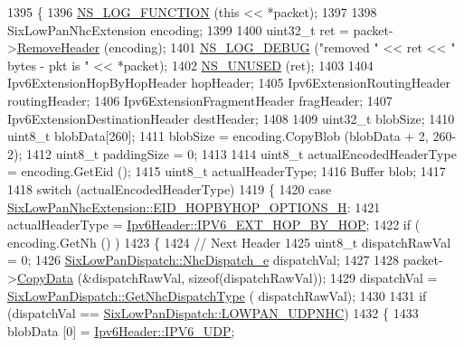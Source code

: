 \begin{DoxyCode}
1395 \{
1396   \hyperlink{log-macros-disabled_8h_a90b90d5bad1f39cb1b64923ea94c0761}{NS\_LOG\_FUNCTION} (\textcolor{keyword}{this} << *packet);
1397 
1398   SixLowPanNhcExtension encoding;
1399 
1400   uint32\_t ret = packet->\hyperlink{classns3_1_1Packet_a0961eccf975d75f902d40956c93ba63e}{RemoveHeader} (encoding);
1401   \hyperlink{group__logging_ga413f1886406d49f59a6a0a89b77b4d0a}{NS\_LOG\_DEBUG} (\textcolor{stringliteral}{"removed "} << ret << \textcolor{stringliteral}{" bytes - pkt is "} << *packet);
1402   \hyperlink{unused_8h_a3ba03ad859378e9f01285afb60f0e3ab}{NS\_UNUSED} (ret);
1403 
1404   Ipv6ExtensionHopByHopHeader hopHeader;
1405   Ipv6ExtensionRoutingHeader routingHeader;
1406   Ipv6ExtensionFragmentHeader fragHeader;
1407   Ipv6ExtensionDestinationHeader destHeader;
1408 
1409   uint32\_t blobSize;
1410   uint8\_t blobData[260];
1411   blobSize = encoding.CopyBlob (blobData + 2, 260-2);
1412   uint8\_t paddingSize = 0;
1413 
1414   uint8\_t actualEncodedHeaderType = encoding.GetEid ();
1415   uint8\_t actualHeaderType;
1416   Buffer blob;
1417 
1418   \textcolor{keywordflow}{switch} (actualEncodedHeaderType)
1419     \{
1420     \textcolor{keywordflow}{case} \hyperlink{classns3_1_1SixLowPanNhcExtension_ac692a22abe80c30bcbafa57ef36bf5ada21fdd5323221baf11ca4aa76cfd75690}{SixLowPanNhcExtension::EID\_HOPBYHOP\_OPTIONS\_H}:
1421       actualHeaderType = \hyperlink{classns3_1_1Ipv6Header_a226429221a066c5e3b1f260caf27d1e9aa0413202f88bebb4f91a138e317b6bbd}{Ipv6Header::IPV6\_EXT\_HOP\_BY\_HOP};
1422       \textcolor{keywordflow}{if} ( encoding.GetNh () )
1423         \{
1424           \textcolor{comment}{// Next Header}
1425           uint8\_t dispatchRawVal = 0;
1426           \hyperlink{classns3_1_1SixLowPanDispatch_acbf93399dca3b5424dcc76de45a57f5f}{SixLowPanDispatch::NhcDispatch\_e} dispatchVal;
1427 
1428           packet->\hyperlink{classns3_1_1Packet_a5a6d304b9e0d90733919ffe224b98f0d}{CopyData} (&dispatchRawVal, \textcolor{keyword}{sizeof}(dispatchRawVal));
1429           dispatchVal = \hyperlink{classns3_1_1SixLowPanDispatch_aadc1e9ded2e292f557da546a6a4e49d2}{SixLowPanDispatch::GetNhcDispatchType} (
      dispatchRawVal);
1430 
1431           \textcolor{keywordflow}{if} (dispatchVal == \hyperlink{classns3_1_1SixLowPanDispatch_acbf93399dca3b5424dcc76de45a57f5faf1d4da6a831d704993ea3946327c8c0c}{SixLowPanDispatch::LOWPAN\_UDPNHC})
1432             \{
1433               blobData [0] = \hyperlink{classns3_1_1Ipv6Header_a226429221a066c5e3b1f260caf27d1e9aef42146d6b211521c22f827b04530253}{Ipv6Header::IPV6\_UDP};

\end{DoxyCode}

